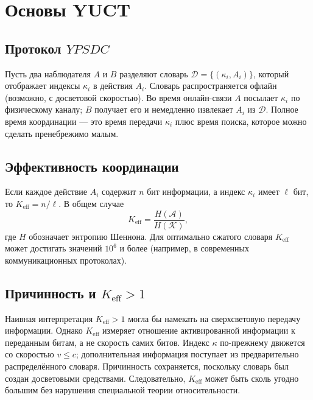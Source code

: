 \documentclass[12pt,a4paper]{article}
\newcommand{\Keff}{K_{\mathrm{eff}}}
\newcommand{\YPSDC}{YPSDC}
\begin{document}
	\section{Основы YUCT}
	\label{sec:foundations}
	
	\subsection{Протокол \(\YPSDC\)}
	\label{subsec:ypsdc}
	
	Пусть два наблюдателя \(A\) и \(B\) разделяют словарь \(\mathcal{D} = \{ (\kappa_i, A_i) \}\), который отображает индексы \(\kappa_i\) в действия \(A_i\). Словарь распространяется офлайн (возможно, с досветовой скоростью). Во время онлайн-связи \(A\) посылает \(\kappa_i\) по физическому каналу; \(B\) получает его и немедленно извлекает \(A_i\) из \(\mathcal{D}\). Полное время координации — это время передачи \(\kappa_i\) плюс время поиска, которое можно сделать пренебрежимо малым.
	
	\subsection{Эффективность координации}
	\label{subsec:keff}
	
	Если каждое действие \(A_i\) содержит \(n\) бит информации, а индекс \(\kappa_i\) имеет \(\ell\) бит, то \(\Keff = n/\ell\). В общем случае
	\begin{equation}
		\Keff = \frac{H(\mathcal{A})}{H(\mathcal{K})},
	\end{equation}
	где \(H\) обозначает энтропию Шеннона. Для оптимально сжатого словаря \(\Keff\) может достигать значений \(10^6\) и более (например, в современных коммуникационных протоколах).
	
	\subsection{Причинность и \(K_{\mathrm{eff}} > 1\)}
	\label{subsec:causality}
	
	Наивная интерпретация \(\Keff > 1\) могла бы намекать на сверхсветовую передачу информации. Однако \(\Keff\) измеряет отношение активированной информации к переданным битам, а не скорость самих битов. Индекс \(\kappa\) по-прежнему движется со скоростью \(v \le c\); дополнительная информация поступает из предварительно распределённого словаря. Причинность сохраняется, поскольку словарь был создан досветовыми средствами. Следовательно, \(\Keff\) может быть сколь угодно большим без нарушения специальной теории относительности.
	
\end{document}
